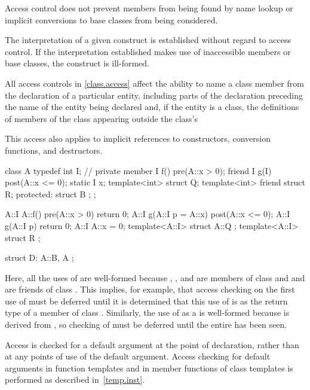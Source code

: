 \pnum
\begin{note}
Access control does not prevent members from being found by name lookup or
implicit conversions to base classes from being considered.
\end{note}
The interpretation of a given construct is
established without regard to access control.
If the interpretation
established makes use of inaccessible members or base classes,
the construct is ill-formed.

\pnum
All access controls in \ref{class.access} affect the ability to name a class member
from the declaration of a particular
entity, including parts of the declaration preceding the name of the entity
being declared and, if the entity is a class, the definitions of members of
the class appearing outside the class's 
\begin{note}
This access also applies to implicit references to constructors,
conversion functions, and destructors.
\end{note}

\pnum
\begin{example}
\begin{codeblock}
class A {
  typedef int I;    // private member
  I f() pre(A::x > 0);
  friend I g(I) post(A::x <= 0);
  static I x;
  template<int> struct Q;
  template<int> friend struct R;
protected:
    struct B { };
};

A::I A::f() pre(A::x > 0) { return 0; }
A::I g(A::I p = A::x) post(A::x <= 0);
A::I g(A::I p) { return 0; }
A::I A::x = 0;
template<A::I> struct A::Q { };
template<A::I> struct R { };

struct D: A::B, A { };
\end{codeblock}

Here, all the uses of
are well-formed because
,
, and 
are members of class
and
and  are friends of class
.
This implies, for example, that access checking on the first use of
must be deferred until it is determined that this use of
is as the return type of a member of class
.
Similarly, the use of  as a
 is well-formed because 
is derived from , so checking of 
must be deferred until the entire  has been seen.
\end{example}

\pnum
{}%
%
Access is checked for a default argument
at the point of declaration,
rather than at any points of use of the default argument.
Access checking for default arguments in function templates and in
member functions of class templates is performed as described in~\ref{temp.inst}.

